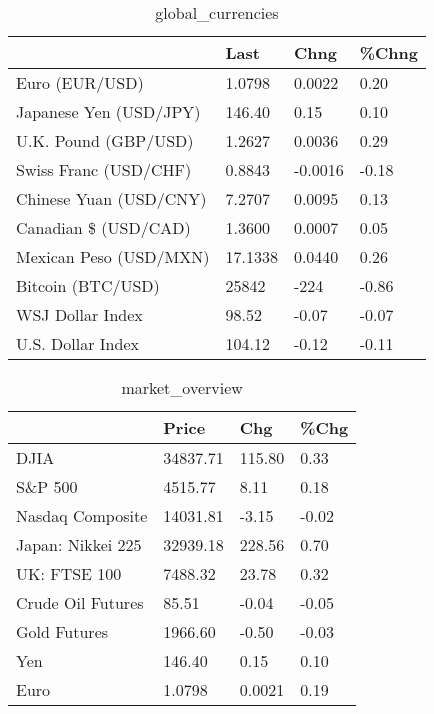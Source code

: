 \documentclass{article}%
\begin{document}
%


\begin{table}[htbp]%
\caption{global\_currencies}%
\centering%
\begin{adjustbox}{width=1\textwidth}%
\begin{tabular}{llll}
\toprule
                       &    Last &    Chng & \%Chng \\
\midrule
        Euro (EUR/USD) &  1.0798 &  0.0022 &  0.20 \\
Japanese Yen (USD/JPY) &  146.40 &    0.15 &  0.10 \\
  U.K. Pound (GBP/USD) &  1.2627 &  0.0036 &  0.29 \\
 Swiss Franc (USD/CHF) &  0.8843 & -0.0016 & -0.18 \\
Chinese Yuan (USD/CNY) &  7.2707 &  0.0095 &  0.13 \\
  Canadian \$ (USD/CAD) &  1.3600 &  0.0007 &  0.05 \\
Mexican Peso (USD/MXN) & 17.1338 &  0.0440 &  0.26 \\
     Bitcoin (BTC/USD) &   25842 &    -224 & -0.86 \\
      WSJ Dollar Index &   98.52 &   -0.07 & -0.07 \\
     U.S. Dollar Index &  104.12 &   -0.12 & -0.11 \\
\bottomrule
\end{tabular}
%
\end{adjustbox}%
\end{table}

%


\begin{table}[htbp]%
\caption{market\_overview}%
\centering%
\begin{adjustbox}{width=1\textwidth}%
\begin{tabular}{llll}
\toprule
                  &    Price &    Chg &  \%Chg \\
\midrule
             DJIA & 34837.71 & 115.80 &  0.33 \\
          S\&P 500 &  4515.77 &   8.11 &  0.18 \\
 Nasdaq Composite & 14031.81 &  -3.15 & -0.02 \\
Japan: Nikkei 225 & 32939.18 & 228.56 &  0.70 \\
     UK: FTSE 100 &  7488.32 &  23.78 &  0.32 \\
Crude Oil Futures &    85.51 &  -0.04 & -0.05 \\
     Gold Futures &  1966.60 &  -0.50 & -0.03 \\
              Yen &   146.40 &   0.15 &  0.10 \\
             Euro &   1.0798 & 0.0021 &  0.19 \\
\bottomrule
\end{tabular}
%
\end{adjustbox}%
\end{table}

%
\end{document}
